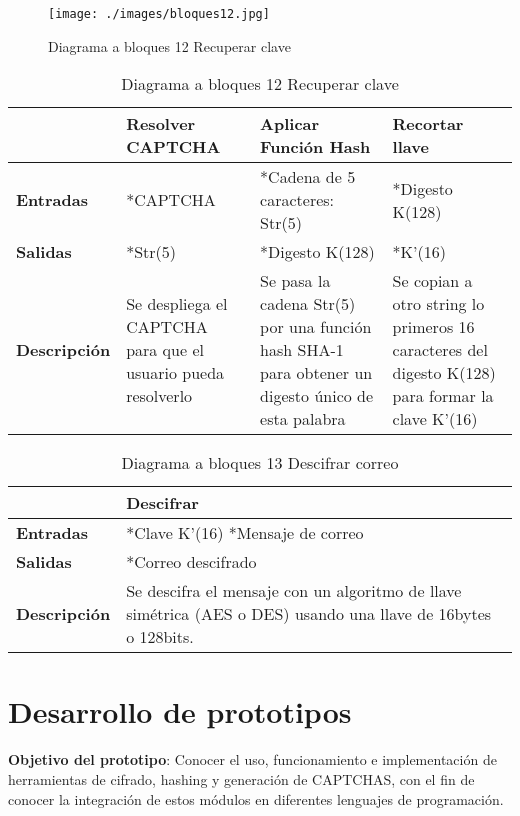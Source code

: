 \documentclass[12pt,oneside,onecolumn,openany]{report}
\begin{document}
\begin{figure}[H]
	\texttt{[image: ./images/bloques12.jpg]}
	\caption{Diagrama a bloques 12 Recuperar clave}
	\label{fig:5-12-1}
\end{figure}
\begin{table}[H]
 \centering
   {
     \begin{tabular}{| p{} | p{3cm} | p{3cm} | p{3cm} |}
     \hline
     & \textbf{Resolver CAPTCHA} & \textbf{Aplicar Función Hash} & \textbf{Recortar llave}\\
     \hline
     \textbf{Entradas} & *CAPTCHA & *Cadena de 5 caracteres: Str(5) & *Digesto K(128)\\
     \hline
     \textbf{Salidas} & *Str(5) & *Digesto K(128) & *K’(16)\\
     \hline
     \textbf{Descripción} & Se despliega el CAPTCHA para que el usuario pueda resolverlo & Se pasa la cadena Str(5) por una función hash SHA-1 para obtener un digesto único de esta palabra & Se copian a otro string lo primeros 16 caracteres del digesto K(128) para formar la clave K’(16)\\

    \end{tabular}
    }
    \caption{Diagrama a bloques 12 Recuperar clave}
    \label{tabla:b12}
\end{table}
\begin{table}[H]
 \centering
   {
     \begin{tabular}{| p{} | p{3cm} |}
     \hline
     & \textbf{Descifrar}\\
     \hline
     \textbf{Entradas} & *Clave K’(16) *Mensaje de correo\\
     \hline
     \textbf{Salidas} & *Correo descifrado\\
     \hline
     \textbf{Descripción} & Se descifra el mensaje con un algoritmo de llave simétrica (AES o DES) usando una llave de 16bytes o 128bits.\\

    \end{tabular}
    }
    \caption{Diagrama a bloques 13 Descifrar correo}
    \label{tabla:b13}
\end{table}

\chapter{Desarrollo de prototipos}
\textbf{Objetivo del prototipo}:
Conocer el uso, funcionamiento e implementación de herramientas de cifrado, hashing y generación de CAPTCHAS, con el fin de conocer la integración de estos módulos en diferentes lenguajes de programación.\\
\end{document}

